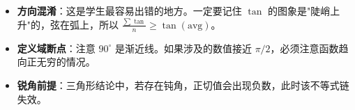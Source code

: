 \begin{trapbox}
\begin{itemize}
    \item \textbf{方向混淆}：这是学生最容易出错的地方。一定要记住 $\tan$ 的图象是"陡峭上升"的，弦在弧上，所以 $\frac{\sum \tan}{n} \geqslant \tan(\text{avg})$。
    \item \textbf{定义域断点}：注意 $90^\circ$ 是渐近线。如果涉及的数值接近 $\pi/2$，必须注意函数趋向正无穷的情况。
    \item \textbf{锐角前提}：三角形结论中，若存在钝角，正切值会出现负数，此时该不等式链失效。
\end{itemize}
\end{trapbox}